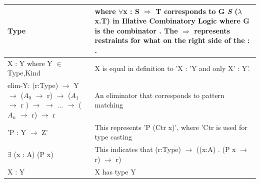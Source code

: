 \documentclass[12pt]{report}
\begin{document}
{\begin{longtable}{|m{5cm}|m{9cm}| }
          Type    &  where $\forall$x : S $\Rightarrow$ T corresponds to 
          $\mathbf{G}$ \textit{S} ($\lambda$x.T) in Illative Combinatory 
          Logic 
          where G is the combinator \cite{CombLogic}. The $\Rightarrow$ 
          represents restraints for what on the right side of the : .\\ 
        \hline
        X : Y  where Y $\in$ {Type,Kind} &  X is equal in definition to 'X : 'Y 
        and only X' : Y'. \\ 
        \hline
        elim-Y: (r:Type) $\rightarrow$ Y $\rightarrow$ ($A_0$ $\rightarrow$ r) 
        $\rightarrow$ ($A_1$ $\rightarrow$ r ) $\rightarrow$ $\rightarrow$ 
        $...$ $\rightarrow$ ($A_n$ $\rightarrow$ r) $\rightarrow$ r   &  An 
        eliminator that corresponds to pattern matching \\ 
        \hline
        'P : Y $\rightarrow$ Z'   &  This represents 'P (Ctr x)', where 'Ctr  
        is used for type casting\\ 
        \hline
         $\exists$ (x : A) (P x) & This indicates that (r:Type) $\rightarrow$ 
         ((x:A) . (P x $\rightarrow$ r) $\rightarrow$ r) \\ 
        \hline
        X : Y   &  X has type Y \\ 
        \hline
        
\end{longtable}

}
\end{document}
